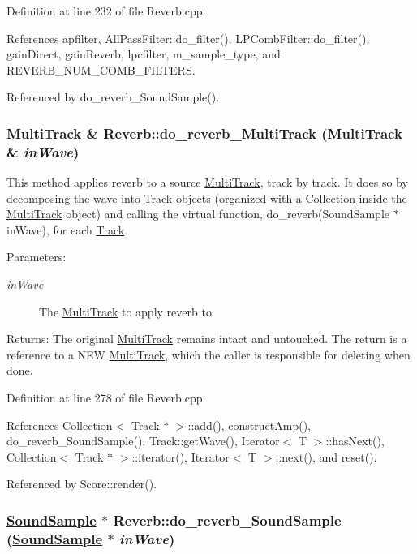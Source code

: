Definition at line 232 of file Reverb.cpp.

References apfilter, All\-Pass\-Filter::do\_\-filter(), LPComb\-Filter::do\_\-filter(), gain\-Direct, gain\-Reverb, lpcfilter, m\_\-sample\_\-type, and REVERB\_\-NUM\_\-COMB\_\-FILTERS.

Referenced by do\_\-reverb\_\-Sound\-Sample().\hypertarget{classReverb_a8}{
\subsubsection[do\_\-reverb\_\-MultiTrack]{\setlength{\rightskip}{0pt plus 5cm}\hyperlink{classMultiTrack}{Multi\-Track} \& Reverb::do\_\-reverb\_\-Multi\-Track (\hyperlink{classMultiTrack}{Multi\-Track} \& {\em in\-Wave})}}
\label{classReverb_a8}


This method applies reverb to a source \hyperlink{classMultiTrack}{Multi\-Track}, track by track. It does so by decomposing the wave into \hyperlink{classTrack}{Track} objects (organized with a \hyperlink{classCollection}{Collection} inside the \hyperlink{classMultiTrack}{Multi\-Track} object) and calling the virtual function, do\_\-reverb(Sound\-Sample $\ast$in\-Wave), for each \hyperlink{classTrack}{Track}. \begin{Desc}
\item[Parameters:]
\begin{description}
\item[{\em in\-Wave}]The \hyperlink{classMultiTrack}{Multi\-Track} to apply reverb to \end{description}
\end{Desc}
\begin{Desc}
\item[Returns:]The original \hyperlink{classMultiTrack}{Multi\-Track} remains intact and untouched. The return is a reference to a NEW \hyperlink{classMultiTrack}{Multi\-Track}, which the caller is responsible for deleting when done. \end{Desc}


Definition at line 278 of file Reverb.cpp.

References Collection$<$ Track $\ast$ $>$::add(), construct\-Amp(), do\_\-reverb\_\-Sound\-Sample(), Track::get\-Wave(), Iterator$<$ T $>$::has\-Next(), Collection$<$ Track $\ast$ $>$::iterator(), Iterator$<$ T $>$::next(), and reset().

Referenced by Score::render().\hypertarget{classReverb_a10}{
\subsubsection[do\_\-reverb\_\-SoundSample]{\setlength{\rightskip}{0pt plus 5cm}\hyperlink{classSoundSample}{Sound\-Sample} $\ast$ Reverb::do\_\-reverb\_\-Sound\-Sample (\hyperlink{classSoundSample}{Sound\-Sample} $\ast$ {\em in\-Wave})}}
\label{classReverb_a10}


